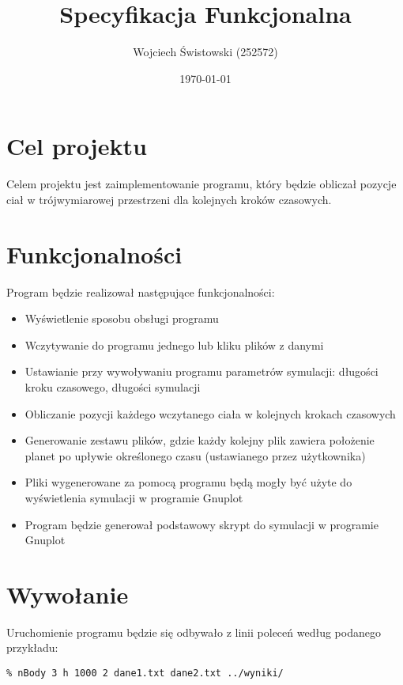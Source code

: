 \documentclass[a4paper,11pt,notitlepage]{article}
\author{Wojciech Świstowski (252572)}
\title{Specyfikacja Funkcjonalna}
\date{\today}
\begin{document}
\maketitle

\section{Cel projektu}

Celem projektu jest zaimplementowanie programu, który będzie obliczał pozycje ciał w trójwymiarowej przestrzeni dla kolejnych kroków czasowych. 

\section{Funkcjonalności}
Program będzie realizował następujące funkcjonalności:
\begin{itemize}[noitemsep]
	\item Wyświetlenie sposobu obsługi programu
	\item Wczytywanie do programu jednego lub kliku plików z danymi
	\item Ustawianie przy wywoływaniu programu parametrów symulacji: długości kroku czasowego, długości symulacji
	\item Obliczanie pozycji każdego wczytanego ciała w kolejnych krokach czasowych
	\item Generowanie zestawu plików, gdzie każdy kolejny plik zawiera położenie planet po upływie określonego czasu (ustawianego przez użytkownika)
	\item Pliki wygenerowane za pomocą programu będą mogły być użyte do wyświetlenia symulacji w programie Gnuplot
	\item Program będzie generował podstawowy skrypt do symulacji w programie Gnuplot
\end{itemize}

\section{Wywołanie}
Uruchomienie programu będzie się odbywało z linii poleceń według podanego przykładu:

\footnotesize\begin{verbatim}
% nBody 3 h 1000 2 dane1.txt dane2.txt ../wyniki/
\end{verbatim}\normalsize
\end{document}

